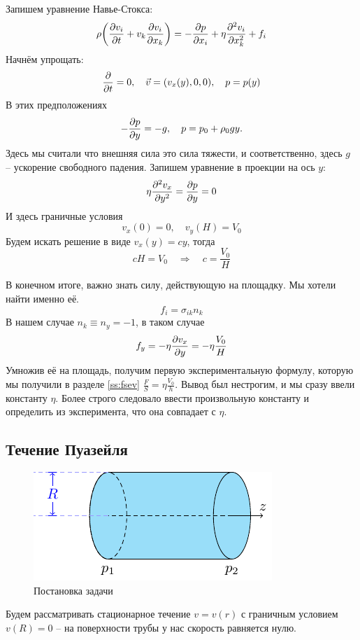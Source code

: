 Запишем уравнение Навье-Стокса:
\begin{equation}
    \rho\qty(
        \pdv{v_i}{t}+v_k\pdv{v_i}{x_k}
    )=
    -\pdv{p}{x_i}+\eta\pdv[2]{v_i}{x_k}+f_i
\end{equation}
Начнём упрощать:
\begin{equation}
    \pdv{t} = 0,\quad
    \vec{v} = \qty(v_x (y),0,0), \quad
    p = p(y)
\end{equation}
В этих предположениях 
\begin{equation}
    -\pdv{p}{y} = -g, \quad
    p = p_0 + \rho_0 g y.
\end{equation}
Здесь мы считали что внешняя сила это сила тяжести, и соответственно, здесь $g$ -- ускорение свободного падения. Запишем уравнение в проекции на ось $y$:
\begin{equation}
    \eta\pdv[2]{v_x}{y} = \pdv{p}{y} = 0
\end{equation}
И здесь граничные условия
\begin{equation}
    v_x (0) = 0, \quad
    v_y (H) = V_0
\end{equation}
Будем искать решение в виде $v_x (y) = cy$, тогда
\begin{equation}
    cH = V_0 \quad \Rightarrow \quad c= \frac{V_0}{H}
\end{equation}

В конечном итоге, важно знать силу, действующую на площадку. Мы хотели найти именно её.
\begin{equation}
    f_i = \sigma_{ik} n_k 
\end{equation}
В нашем случае $n_k \equiv n_y = -1$, в таком случае
\begin{equation}
    f_y = -\eta \pdv{v_x}{y}= -\eta \frac{V_0}{H}
\end{equation}
Умножив её на площадь, получим первую экспериментальную формулу, которую мы получили в разделе \ref{ss:fsev} $\frac{F}{S} = \eta \frac{V_0}{h}$. Вывод был нестрогим, и мы сразу ввели константу $\eta$. Более строго следовало ввести произвольную константу и определить из эксперимента, что она совпадает с $\eta$.

\subsection{Течение Пуазейля}
\begin{figure}[h!]
    \centering
    \includegraphics[scale=1.5]{img/puaz}
    \caption{Постановка задачи}
    \label{fig:figure1}
\end{figure}
Будем рассматривать стационарное течение $v = v(r)$  с граничным условием $v(R)=0$ -- на поверхности трубы у нас скорость равняется нулю. 

